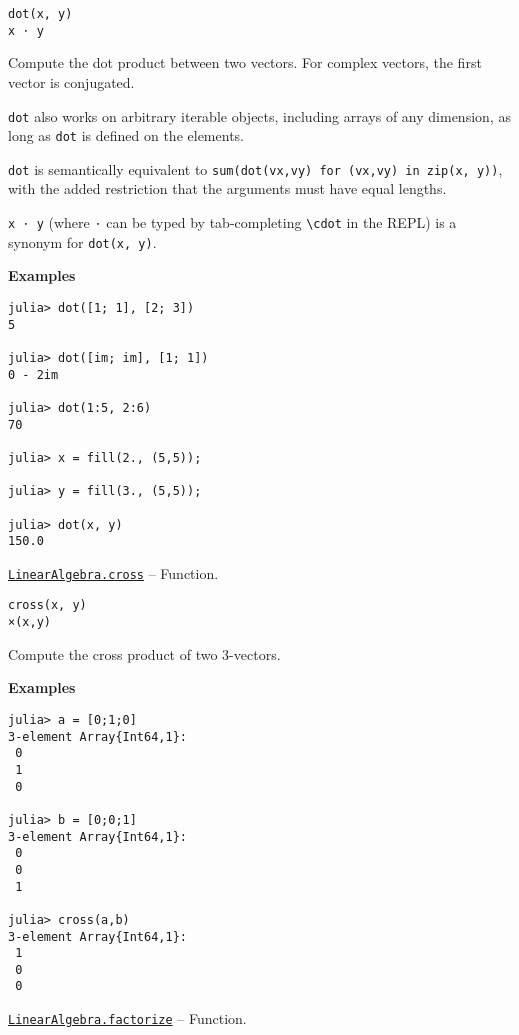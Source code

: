 \begin{adjustwidth}{2em}{0pt}


\begin{verbatim}
dot(x, y)
x ⋅ y
\end{verbatim}

Compute the dot product between two vectors. For complex vectors, the first vector is conjugated.

\texttt{dot} also works on arbitrary iterable objects, including arrays of any dimension, as long as \texttt{dot} is defined on the elements.

\texttt{dot} is semantically equivalent to \texttt{sum(dot(vx,vy) for (vx,vy) in zip(x, y))}, with the added restriction that the arguments must have equal lengths.

\texttt{x ⋅ y} (where \texttt{⋅} can be typed by tab-completing \texttt{{\textbackslash}cdot} in the REPL) is a synonym for \texttt{dot(x, y)}.

\textbf{Examples}


\begin{verbatim}
julia> dot([1; 1], [2; 3])
5

julia> dot([im; im], [1; 1])
0 - 2im

julia> dot(1:5, 2:6)
70

julia> x = fill(2., (5,5));

julia> y = fill(3., (5,5));

julia> dot(x, y)
150.0
\end{verbatim}



\end{adjustwidth}
\hypertarget{7470245664307242183}{} 
\hyperlink{7470245664307242183}{\texttt{LinearAlgebra.cross}}  -- {Function.}

\begin{adjustwidth}{2em}{0pt}


\begin{verbatim}
cross(x, y)
×(x,y)
\end{verbatim}

Compute the cross product of two 3-vectors.

\textbf{Examples}


\begin{verbatim}
julia> a = [0;1;0]
3-element Array{Int64,1}:
 0
 1
 0

julia> b = [0;0;1]
3-element Array{Int64,1}:
 0
 0
 1

julia> cross(a,b)
3-element Array{Int64,1}:
 1
 0
 0
\end{verbatim}



\end{adjustwidth}
\hypertarget{7042962205548658937}{} 
\hyperlink{7042962205548658937}{\texttt{LinearAlgebra.factorize}}  -- {Function.}

